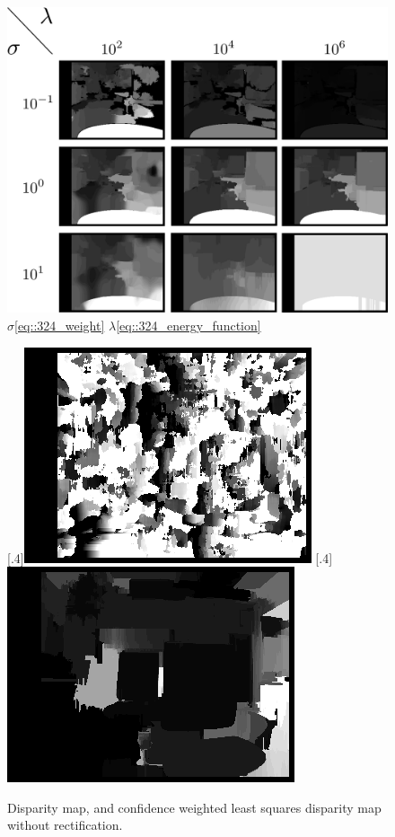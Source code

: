 \begin{figure}[h]
	\centering
	\includegraphics[scale=.25]{chapters/05_experiments/02_depth_map_parameter_tuning/sigma_lambda.png}
	\caption{$\sigma$\ref{eq::324_weight} $\lambda$\ref{eq::324_energy_function}}
	\label{fig::52_sigma_lambda}
\end{figure}
\begin{figure}[h]
	\centering
	\subcaptionbox{}%
	[.4\linewidth]{\includegraphics[scale=.3]{chapters/05_experiments/02_depth_map_parameter_tuning/disp_no_calib.png}}
	\subcaptionbox{}%
	[.4\linewidth]{\includegraphics[scale=.3]{chapters/05_experiments/02_depth_map_parameter_tuning/wls_no_calib.png}}
	\caption{Disparity map, and confidence weighted least squares disparity map without rectification.}
	\label{fig::52_no_calib}
\end{figure}